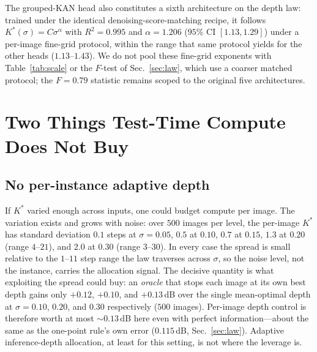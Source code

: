 \documentclass[letterpaper]{article}
\begin{document}
The grouped-KAN head also constitutes a sixth architecture on the depth law: trained under the
identical denoising-score-matching recipe, it follows $K^{*}(\sigma)=C\sigma^{\alpha}$ with
$R^{2}=0.995$ and $\alpha=1.206$ ($95\%$ CI $[1.13,1.29]$) under a per-image fine-grid protocol,
within the range that same protocol yields for the other heads ($1.13$--$1.43$). We do not pool
these fine-grid exponents with Table~\ref{tab:scale} or the $F$-test of Sec.~\ref{sec:law}, which
use a coarser matched protocol; the $F=0.79$ statistic remains scoped to the original five
architectures.

\section{Two Things Test-Time Compute Does Not Buy}
\label{sec:limits}
\subsection{No per-instance adaptive depth}
\label{sec:adaptive}
If $K^{*}$ varied enough across inputs, one could budget compute per image. The variation exists and
grows with noise: over $500$ images per level, the per-image $K^{*}$ has standard deviation $0.1$ steps
at $\sigma{=}0.05$, $0.5$ at $0.10$, $0.7$ at $0.15$, $1.3$ at $0.20$ (range $4$--$21$), and $2.0$ at
$0.30$ (range $3$--$30$). In every case the spread is small relative to the $1$--$11$ step range the law
traverses across $\sigma$, so the noise level, not the instance, carries the allocation signal. The
decisive quantity is what exploiting the spread could buy: an \emph{oracle} that stops each image at its
own best depth gains only $+0.12$, $+0.10$, and $+0.13$\,dB over the single mean-optimal depth at
$\sigma=0.10$, $0.20$, and $0.30$ respectively ($500$ images). Per-image depth control is therefore worth
at most ${\sim}0.13$\,dB here even with perfect information---about the same as the one-point rule's own
error ($0.115$\,dB, Sec.~\ref{sec:law}). Adaptive inference-depth allocation, at least for this setting,
is not where the leverage is.
\end{document}
